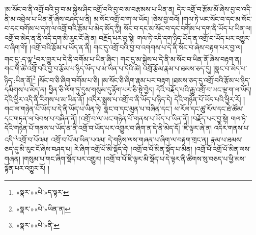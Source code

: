 །མ་སོང་བ་ནི་འགྲོ་བའི་བྱ་བ་མ་སྐྱེས་ཤིང་འགྲོ་བའི་བྱ་བ་མ་བརྩམས་པ་ཡིན་ན། དེར་འགྲོ་བ་རྩོམ་མོ་ཞེས་བྱ་བ་འདི་ནི་མ་འབྲེལ་པ་ཡིན་ནོ་ཞེས་བཤད་པ་ནི། མ་སོང་འགྲོ་བ་ག་ལ་ཡོད། །ཅེས་བྱ་བའོ། །གལ་ཏེ་ཡང་སོང་བ་དང་མ་སོང་བ་དང་བགོམ་པ་དག་ལ་འགྲོ་བའི་རྩོམ་པ་མེད་མོད་ཀྱི། སོང་བ་དང་མ་སོང་བ་དང་བགོམ་པ་དག་ནི་ཡོད་པ་ཡིན་ལ། འགྲོ་བ་མེད་ན་ནི་འདི་དག་མི་རུང་ངོ་ཞེ་ན། བརྗོད་པར་བྱ་སྟེ། གལ་ཏེ་འདི་དག་ཉིད་ཡོད་ན་འགྲོ་བ་ཡོད་པར་འགྱུར་བ་ཞིག་གོ། །འགྲོ་བའི་རྩོམ་པ་ཡོད་ན་ནི། གང་དུ་འགྲོ་བའི་བྱ་བ་འགགས་པ་དེ་ནི་སོང་བ་ཞེས་བརྟག་པར་བྱ་ལ། གང་དུ་:ད་ལྟ་\footnote{«སྣར་»«པེ་»ད་ལྟར་}བར་གྱུར་པ་དེ་ནི་བགོམ་པ་ཡིན་ཞིང་། གང་དུ་མ་སྐྱེས་པ་དེ་ནི་མ་སོང་བ་ཡིན་ནོ་ཞེས་བརྟག་ན། གང་གི་ཚེ་འགྲོ་བའི་བྱ་བ་རྩོམ་པ་ཉིད་ཡོད་པ་མ་ཡིན་པ་དེའི་ཚེ། འགྲོ་རྩོམ་རྣམ་པ་ཐམས་ཅད་དུ། །སྣང་བ་མེད་པ་ཉིད་:ཡིན་ནོ།\footnote{«སྣར་»«པེ་»ཡིན་ན།} །སོང་བ་ཅི་ཞིག་བགོམ་པ་ཅི། །མ་སོང་ཅི་ཞིག་རྣམ་པར་བརྟག །ཐམས་ཅད་དུ་འགྲོ་བའི་རྩོམ་པ་ཉིད་དམིགས་པ་མེད་ན། ཕྱིན་ཅི་ལོག་ཏུ་དུས་གསུམ་དུ་རྟོག་པར་ཅི་སྟེ་བྱེད། དེའི་བརྗོད་པའི་རྒྱུ་འགྲོ་བ་ཡང་ལྟ་ག་ལ་ཡོད། དེའི་ཕྱིར་འདི་ནི་རིགས་པ་མ་ཡིན་ནོ། །འདིར་སྨྲས་པ་འགྲོ་བ་ནི་ཡོད་པ་ཉིད་དེ། དེའི་གཉེན་པོ་ཡོད་པའི་ཕྱིར་རོ། །གང་ལ་གཉེན་པོ་ཡོད་པ་དེ་ནི་ཡོད་པ་ཡིན་ཏེ། སྣང་བ་དང་མུན་པ་བཞིན་དང་། ཕ་རོལ་དང་ཚུ་རོལ་དང་ཐེ་ཚོམ་དང་གཏན་ལ་ཕེབས་པ་བཞིན་ནོ། །འགྲོ་བ་ལ་ཡང་གཉེན་པོ་གནས་པ་ཡོད་པ་ཡིན་ནོ། །བརྗོད་པར་བྱ་སྟེ། གལ་ཏེ་དེའི་གཉེན་པོ་གནས་པ་ཡོད་ན་ནི་འགྲོ་བ་ཡོད་པར་འགྱུར་བ་ཞིག་ན་དེ་ནི་མེད་དོ། །ཇི་ལྟར་ཞེ་ན། འདིར་གནས་པ་འདི་\footnote{«སྣར་»«པེ་»ནི་}འགྲོ་བ་པོའམ། འགྲོ་བ་པོ་མ་ཡིན་པའམ། དེ་གཉིས་ལས་གཞན་པ་ཞིག་ལ་བརྟག་གྲང་ན། རྣམ་པ་ཐམས་ཅད་དུ་མི་རུང་ངོ་ཞེས་བཤད་པ། རེ་ཞིག་འགྲོ་པོ་མི་སྡོད་དེ། །འགྲོ་བ་པོ་མིན་སྡོད་པ་མིན། །འགྲོ་པོ་འགྲོ་པོ་མིན་ལས་གཞན། །གསུམ་པ་གང་ཞིག་སྡོད་པར་འགྱུར། །འགྲོ་བ་པོ་ཇི་ལྟར་མི་སྡོད་པ་དེ་ལྟར་ནི་ཚིགས་སུ་བཅད་པ་ཕྱི་མས་སྟོན་པར་འགྱུར་རོ། །
